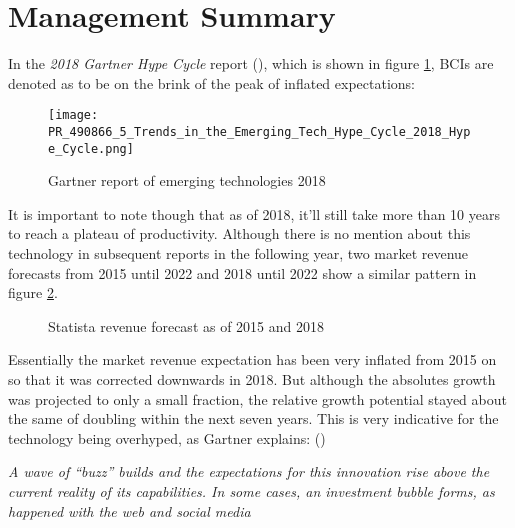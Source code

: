         \section{Management Summary}

            In the \textit{2018 Gartner Hype Cycle} report (\cite{Gartner.24052021}), which is shown in figure \ref*{gartner-2018}, BCIs are denoted as to be on the brink of the peak of inflated expectations:

            \begin{figure}[h]     %
                \centering
                \texttt{[image: PR\_490866\_5\_Trends\_in\_the\_Emerging\_Tech\_Hype\_Cycle\_2018\_Hype\_Cycle.png]} 
                \caption{Gartner report of emerging technologies 2018}\label{gartner-2018}
            \end{figure}

            It is important to note though that as of 2018, it'll still take more than 10 years to reach a plateau of productivity.
            Although there is no mention about this technology in subsequent reports in the following year, two market revenue forecasts from 2015 until 2022 and 2018 until 2022 show a similar pattern in figure \ref*{statista-revenue}.

            \begin{figure}[h]
                \centering
                \caption{Statista revenue forecast as of 2015 and 2018}%
                \label{statista-revenue}
            \end{figure}        

            Essentially the market revenue expectation has been very inflated from 2015 on so that it was corrected downwards in 2018. But although the absolutes growth was projected to only a small fraction, the relative growth potential stayed about the same of doubling within the next seven years. This is very indicative for the technology being overhyped, as Gartner explains: (\cite{Gartner.24052021})

            \medskip
                \emph{A wave of “buzz” builds and the expectations for this innovation rise above the current reality of its capabilities. In some cases, an investment bubble forms, as happened with the web and social media}
            \medskip

